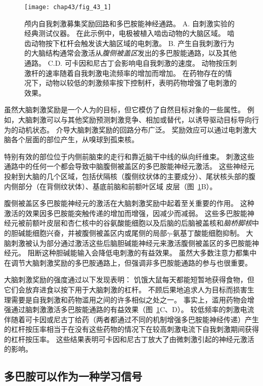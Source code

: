 \begin{figure}[htbp]
	\centering
	\texttt{[image: chap43/fig\_43\_1]}
	\caption{颅内自我刺激募集奖励回路和多巴胺能神经通路。
		A. 自刺激实验的经典测试仪器。
		在此示例中，电极被植入啮齿动物的大脑区域。
		啮齿动物按下杠杆会触发该大脑区域的电刺激。
		B. 产生自我刺激行为的大脑结构通常会激活从\textit{腹侧被盖区}发出的多巴胺能通路，以及其他通路。
		C.D. 可卡因和尼古丁会影响电自我刺激的速度。
		动物按压刺激杆的速率随着自我刺激电流频率的增加而增加。
		在药物存在的情况下，动物以较低的刺激频率按下控制杆，表明药物增强了电刺激的效果。}
	\label{fig:43_1}
\end{figure}


虽然大脑刺激奖励是一个人为的目标，但它模仿了自然目标对象的一些属性。
例如，大脑刺激可以与其他奖励预测刺激竞争、相加或替代，以诱导驱动目标导向行为的动机状态。
介导大脑刺激奖励的回路分布广泛。
奖励效应可以通过电刺激大脑各个层面的部位产生，从嗅球到孤束核。


特别有效的部位位于内侧前脑束的走行和靠近脑干中线的纵向纤维束。
刺激这些通路中的任何一个都会导致中脑腹侧被盖区的多巴胺能神经元激活。
这些神经元投射到大脑的几个区域，包括伏隔核（腹侧纹状体的主要成分）、尾状核头部的腹内侧部分（在背侧纹状体）、基底前脑和前额叶区域 皮层（图~\ref{fig:43_1}B）。


腹侧被盖区多巴胺能神经元的激活在大脑刺激奖励中起着至关重要的作用。
这种激活的效果因多巴胺能突触传递的增加而增强，因减少而减弱。
这些多巴胺能神经元被前额叶皮层和杏仁核中的谷氨酸能细胞以及后脑的后脑被盖核和\textit{脑桥脚核}中的胆碱能细胞兴奋，并被腹侧被盖区内或尾侧的局部$\gamma$-氨基丁酸能细胞抑制。
大脑刺激被认为部分通过激活这些后脑胆碱能神经元来激活腹侧被盖区的多巴胺能神经元。
阻断这种胆碱能输入会降低电刺激的有益效果。
虽然大多数注意力都集中在调节大脑刺激奖励的多巴胺通路上，但强调非多巴胺能通路的参与也很重要。


大脑刺激奖励的强度通过以下发现表明：
饥饿大鼠每天都能短暂地获得食物，但它们会放弃进食以按下用于大脑刺激的杠杆。
不顾后果地追求人为目标而损害生理需要是自我刺激和药物滥用之间的许多相似之处之一。
事实上，滥用药物会增强通过脑刺激激活多巴胺能通路的有益效果（图~\ref{fig:43_1}C、D）。
较低频率的刺激电流伴随着可卡因或尼古丁给药（两者都通过不同的机制增强多巴胺能神经传递）产生的杠杆按压率相当于在没有这些药物的情况下在较高刺激电流下自我刺激期间获得的杠杆按压率。
这些结果表明可卡因和尼古丁放大了由微刺激引起的神经元激活的影响。



\subsection{多巴胺可以作为一种学习信号}

